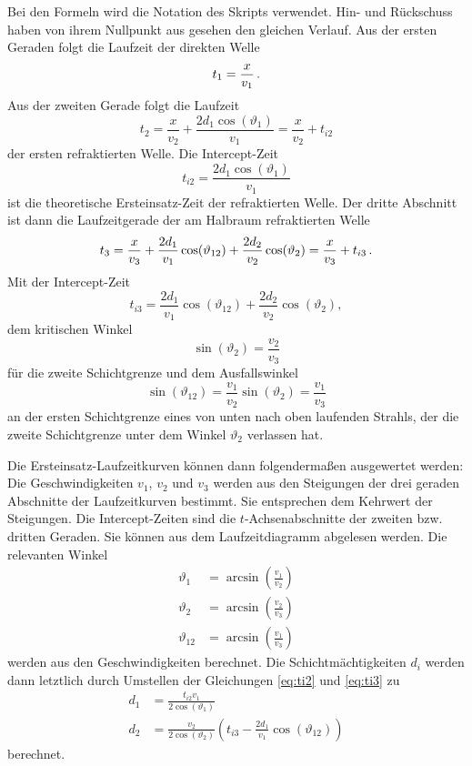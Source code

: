 Bei den Formeln wird die Notation des Skripts \cite{skript} verwendet. Hin- und Rückschuss haben von ihrem Nullpunkt aus gesehen den gleichen Verlauf. Aus der ersten Geraden folgt die Laufzeit der direkten Welle
\begin{equation}
 t_1=\frac{x}{v_1} \text{\,.}
\end{equation}
Aus der zweiten Gerade folgt die Laufzeit
\begin{equation}
 t_2=\frac{x}{v_2}+\frac{2d_1\cos(\vartheta_1)}{v_1}=\frac{x}{v_2}+t_{i2}
\end{equation}
der ersten refraktierten Welle. Die Intercept-Zeit
\begin{equation}
\label{eq:ti2}
 t_{i2}=\frac{2d_1\cos(\vartheta_1)}{v_1}
\end{equation}
ist die theoretische Ersteinsatz-Zeit der refraktierten Welle. Der dritte Abschnitt ist dann die Laufzeitgerade der am Halbraum refraktierten Welle
\begin{equation}
 t_3=\frac{x}{v_3}+\frac{2d_1}{v_1}\cos(\vartheta_{12})+\frac{2d_2}{v_2}\cos(\vartheta_2)=\frac{x}{v_3}+t_{i3} \text{\,.}
\end{equation}
Mit der Intercept-Zeit
\begin{equation}
\label{eq:ti3}
 t_{i3}=\frac{2d_1}{v_1}\cos(\vartheta_{12})+\frac{2d_2}{v_2}\cos(\vartheta_2)\comma
\end{equation}
dem kritischen Winkel 
\begin{equation}
 \sin(\vartheta_2)=\frac{v_2}{v_3}
\end{equation}
für die zweite Schichtgrenze und dem Ausfallswinkel
\begin{equation}
 \sin(\vartheta_{12})=\frac{v_1}{v_2}\sin(\vartheta_2)=\frac{v_1}{v_3}
\end{equation}
an der ersten Schichtgrenze eines von unten nach oben laufenden Strahls, der die zweite Schichtgrenze unter dem Winkel $\vartheta_2$ verlassen hat.

Die Ersteinsatz-Laufzeitkurven können dann folgendermaßen ausgewertet werden: Die Geschwindigkeiten $v_1$, $v_2$ und $v_3$ werden aus den Steigungen der drei geraden Abschnitte der Laufzeitkurven bestimmt. Sie entsprechen dem Kehrwert der Steigungen. Die Intercept-Zeiten sind die $t$-Achsenabschnitte der zweiten bzw. dritten Geraden. Sie können aus dem Laufzeitdiagramm abgelesen werden. Die relevanten Winkel
\begin{align}
 \vartheta_1&=\arcsin\left(\frac{v_1}{v_2}\right) \\
 \vartheta_2&=\arcsin\left(\frac{v_2}{v_3}\right) \\
 \vartheta_{12}&=\arcsin\left(\frac{v_1}{v_3}\right)
\end{align}
werden aus den Geschwindigkeiten berechnet. Die Schichtmächtigkeiten $d_i$ werden dann letztlich durch Umstellen der Gleichungen \eqref{eq:ti2} und \eqref{eq:ti3} zu
\begin{align}
 d_1&=\frac{t_{i2}v_1}{2\cos(\vartheta_1)} \\
 d_2&=\frac{v_2}{2\cos(\vartheta_2)}\left(t_{i3}-\frac{2d_1}{v_1}\cos(\vartheta_{12})\right)
\end{align}
berechnet.

